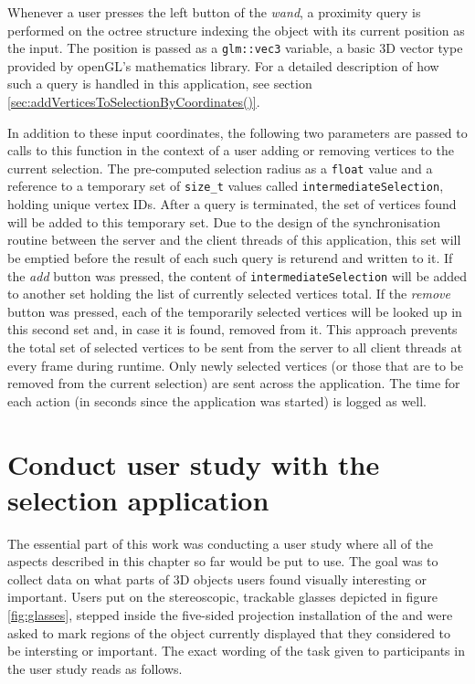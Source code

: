 Whenever a user presses the left button of the \textit{wand}, a proximity query is performed on the octree structure indexing the object with its current position as the input. The position is passed as a \texttt{glm::vec3} variable, a basic 3D vector type provided by openGL's mathematics library. For a detailed description of how such a query is handled in this application, see section \ref{sec:addVerticesToSelectionByCoordinates()}.

In addition to these input coordinates, the following two parameters are passed to calls to this function in the context of a user adding or removing vertices to the current selection. The pre-computed selection radius as a \texttt{float} value and a reference to a temporary set of \texttt{size\_t} values called \texttt{intermediateSelection}, holding unique vertex IDs. After a query is terminated, the set of vertices found will be added to this temporary set.
Due to the design of the synchronisation routine between the server and the client threads of this application, this set will be emptied before the result of each such query is returend and written to it. If the \textit{add} button was pressed, the content of \texttt{intermediateSelection} will be added to another set holding the list of currently selected vertices total. If the \textit{remove} button was pressed, each of the temporarily selected vertices will be looked up in this second set and, in case it is found, removed from it. This approach prevents the total set of selected vertices to be sent from the server to all client threads at every frame during runtime. Only newly selected vertices (or those that are to be removed from the current selection) are sent across the application. The time for each action (in seconds since the application was started) is logged as well. 

	\section {Conduct user study with the selection application}
	\label{sec:conduct_user_study_with_the_selection_application}
The essential part of this work was conducting a user study where all of the aspects described in this chapter so far would be put to use. The goal was to collect data on what parts of 3D objects users found visually interesting or important. Users put on the stereoscopic, trackable glasses depicted in figure \ref{fig:glasses}, stepped inside the five-sided projection installation of the \cite{v2c} and were asked to mark regions of the object currently displayed that they considered to be intersting or important. The exact wording of the task given to participants in the user study reads as follows.

